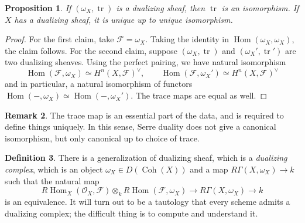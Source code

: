 \documentclass[10pt]{article}
\newtheorem{thm}{Theorem}[section]
\newtheorem{prop}[thm]{Proposition}
\theoremstyle{definition}
\newtheorem{defn}[thm]{Definition}
\newtheorem{rmk}[thm]{Remark}
\DeclareMathOperator{\Hom}{Hom}
\DeclareMathOperator{\Ext}{Ext}
\DeclareMathOperator{\Coh}{Coh}
\DeclareMathOperator{\Spec}{Spec}
\DeclareMathOperator{\QCoh}{QCoh}
\DeclareMathOperator{\tr}{tr}
\newcommand{\OO}{\mathcal{O}}
\newcommand{\todo}[1]{\textbf{\textcolor{red}{TODO #1}}}
\begin{document}
\begin{prop}
If $(\omega_X, \tr)$ is a dualizing sheaf, then $\tr$ is an isomorphism.  If $X$ has a dualizing sheaf, it is unique up to unique isomorphism.
\end{prop}
\begin{proof}
For the first claim, take $\mathcal{F} = \omega_X$.  Taking the identity in $\Hom(\omega_X, \omega_X)$, the claim follows.  For the second claim, suppose $(\omega_X, \tr)$ and $(\omega_X', \tr')$ are two dualizing sheaves.  Using the perfect pairing, we have natural isomorphism
$$\Hom(\mathcal{F}, \omega_X) \simeq H^n(X, \mathcal{F})^\vee, \;\;\;\;\;\;\; \Hom(\mathcal{F}, \omega_X') \simeq H^n(X, \mathcal{F})^\vee$$
and in particular, a natural isomorphism of functors $\Hom(-, \omega_X) \simeq \Hom(-, \omega_X')$.  The trace maps are equal as well.

\end{proof}

\begin{rmk}
The trace map is an essential part of the data, and is required to define things uniquely.  In this sense, Serre duality does not give a canonical isomorphism, but only canonical up to choice of trace.
\end{rmk}




\begin{defn}
There is a generalization of dualizing sheaf, which is a \emph{dualizing complex}, which is an object $\omega_X \in D(\Coh(X))$ and a map $R\Gamma(X, \omega_X) \rightarrow k$ such that the natural map
$$R\Hom_X(\OO_X, \mathcal{F}) \otimes_k R\Hom(\mathcal{F}, \omega_X) \rightarrow R\Gamma(X, \omega_X) \rightarrow k$$
is an equivalence.  It will turn out to be a tautology that every scheme admits a dualizing complex; the difficult thing is to compute and understand it.
\end{defn}
\end{document}
